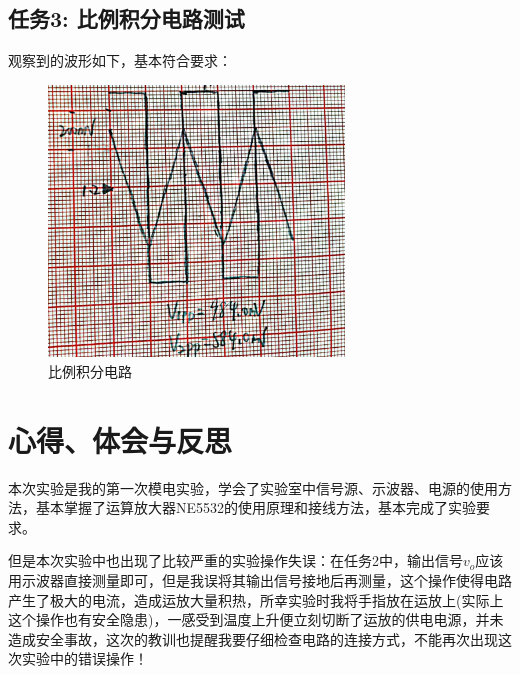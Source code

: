 \documentclass[a4paper,11pt,UTF8]{article}
\begin{document}
\subsection{任务3: 比例积分电路测试}
观察到的波形如下，基本符合要求：
\begin{figure}[H]
	\centering
	\includegraphics[width=0.7\textwidth]{1.12}
	\caption*{比例积分电路}
\end{figure}
\section{心得、体会与反思}
本次实验是我的第一次模电实验，学会了实验室中信号源、示波器、电源的使用方法，基本掌握了运算放大器NE5532的使用原理和接线方法，基本完成了实验要求。

但是本次实验中也出现了比较严重的实验操作失误：在任务2中，输出信号$v_o$应该用示波器直接测量即可，但是我误将其输出信号接地后再测量，这个操作使得电路产生了极大的电流，造成运放大量积热，所幸实验时我将手指放在运放上(实际上这个操作也有安全隐患)，一感受到温度上升便立刻切断了运放的供电电源，并未造成安全事故，这次的教训也提醒我要仔细检查电路的连接方式，不能再次出现这次实验中的错误操作！
\end{document}
